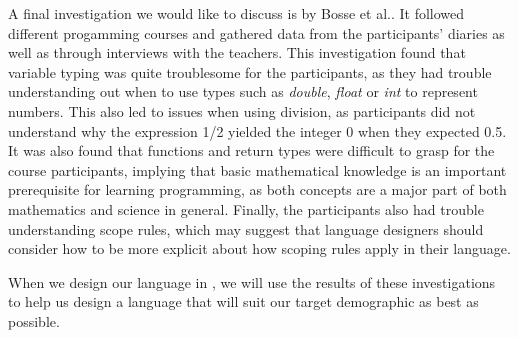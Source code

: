 A final investigation we would like to discuss is by Bosse et al.\cite{bosseWhyProgrammingDifficult2017}.
It followed different progamming courses and gathered data from the participants' diaries as well as through interviews with the teachers.
This investigation found that variable typing was quite troublesome for the participants, as they had trouble understanding out when to use
types such as \emph{double}, \emph{float} or \emph{int} to represent numbers. This also led to issues when using division, as participants
did not understand why the expression 1/2 yielded the integer 0 when they expected 0.5.
It was also found that functions and return types were difficult to grasp for the course participants, implying that basic mathematical
knowledge is an important prerequisite for learning programming, as both concepts are a major part of both mathematics and science in general.
Finally, the participants also had trouble understanding scope rules, which may suggest that language designers should consider how to
be more explicit about how scoping rules apply in their language.


When we design our language in , we will use the results of these investigations to help us design a language that will suit our target demographic
as best as possible.
